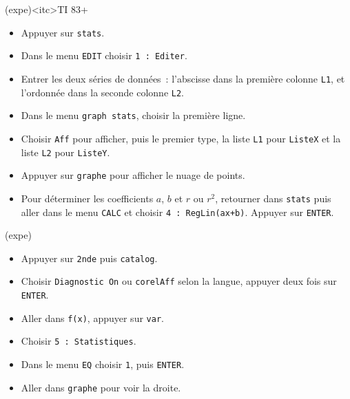 \documentclass[a4paper, 12pt, garamond]{book}
\begin{document}
\begin{tcb}[breakable](expe)<itc>{TI 83+}
	\begin{itemize}[leftmargin=10pt]
		\item Appuyer sur \texttt{stats}.
		\item Dans le menu \texttt{EDIT} choisir \texttt{1~: Editer}.
		\item Entrer les deux séries de données~: l'abscisse dans la première colonne
		      \texttt{L1}, et l'ordonnée dans la seconde colonne \texttt{L2}.
		\item Dans le menu \texttt{graph stats}, choisir la première ligne.
		\item Choisir \texttt{Aff} pour afficher, puis le premier type, la liste
		      \texttt{L1} pour \texttt{ListeX} et la liste \texttt{L2} pour
		      \texttt{ListeY}.
		\item Appuyer sur \texttt{graphe} pour afficher le nuage de points.
		\item Pour déterminer les coefficients $a$, $b$ et $r$ ou $r^{2}$,
		      retourner dans \texttt{stats} puis aller dans le menu \texttt{CALC} et
		      choisir \texttt{4~: RegLin(ax+b)}. Appuyer sur \texttt{ENTER}.
	\end{itemize}
	\begin{isd}(expe)
		\begin{itemize}[leftmargin=10pt]
			\item Appuyer sur \texttt{2nde} puis \texttt{catalog}.
			\item Choisir \texttt{Diagnostic On} ou \texttt{corelAff} selon la langue,
			      appuyer deux fois sur \texttt{ENTER}.
		\end{itemize}
		\tcblower
		\begin{itemize}[leftmargin=10pt]
			\item Aller dans \texttt{f(x)}, appuyer sur \texttt{var}.
			\item Choisir \texttt{5~: Statistiques}.
			\item Dans le menu \texttt{EQ} choisir \texttt{1}, puis \texttt{ENTER}.
			\item Aller dans \texttt{graphe} pour voir la droite.
		\end{itemize}
	\end{isd}
\end{tcb}
\end{document}
